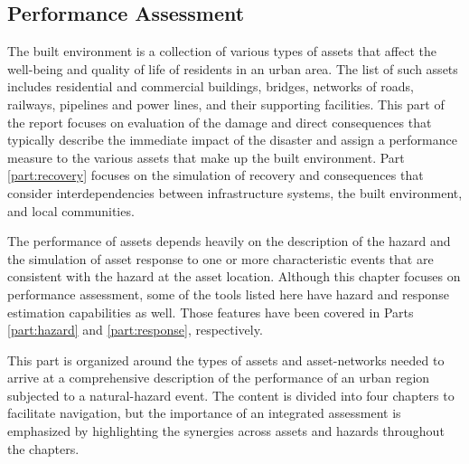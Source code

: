 
\begin{partbacktext}
\part{Performance Assessment}\label{part:Performance}

The built environment is a collection of various types of assets that affect the well-being and quality of life of residents in an urban area. The list of such assets includes residential and commercial buildings, bridges, networks of roads, railways, pipelines and power lines, and their supporting facilities. This part of the report focuses on evaluation of the damage and direct consequences that typically describe the immediate impact of the disaster and assign a performance measure to the various assets that make up the built environment. Part \ref{part:recovery} focuses on the simulation of recovery and consequences that consider interdependencies between infrastructure systems, the built environment, and local communities.

The performance of assets depends heavily on the description of the hazard and the simulation of asset response to one or more characteristic events that are consistent with the hazard at the asset location. Although this chapter focuses on performance assessment, some of the tools listed here have hazard and response estimation capabilities as well. Those features have been covered in Parts \ref{part:hazard} and \ref{part:response}, respectively. 

This part is organized around the types of assets and asset-networks needed to arrive at a comprehensive description of the performance of an urban region subjected to a natural-hazard event. The content is divided into four chapters to facilitate navigation, but the importance of an integrated assessment is emphasized by highlighting the synergies across assets and hazards throughout the chapters.

\end{partbacktext}
